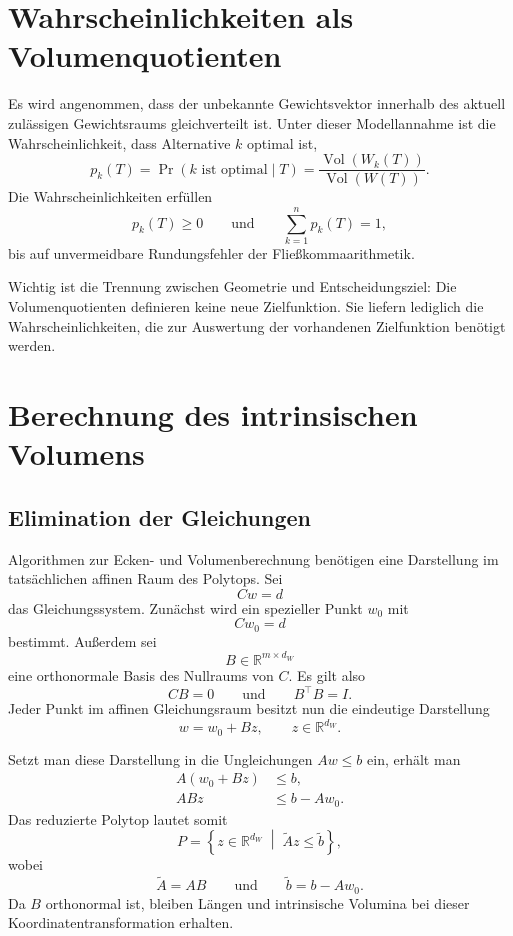\documentclass[11pt,a4paper]{article}
\newcommand{\R}{\mathbb{R}}
\newcommand{\Vol}{\operatorname{Vol}}
\begin{document}
\section{Wahrscheinlichkeiten als Volumenquotienten}

Es wird angenommen, dass der unbekannte Gewichtsvektor innerhalb des aktuell
zulässigen Gewichtsraums gleichverteilt ist. Unter dieser Modellannahme ist
die Wahrscheinlichkeit, dass Alternative $k$ optimal ist,
\[
  p_k(T)
  =
  \Pr(k\text{ ist optimal}\mid T)
  =
  \frac{\Vol(W_k(T))}{\Vol(W(T))}.
\]
Die Wahrscheinlichkeiten erfüllen
\[
  p_k(T)\geq 0
  \qquad\text{und}\qquad
  \sum_{k=1}^{n}p_k(T)=1,
\]
bis auf unvermeidbare Rundungsfehler der Fließkommaarithmetik.

Wichtig ist die Trennung zwischen Geometrie und Entscheidungsziel:
Die Volumenquotienten definieren keine neue Zielfunktion. Sie liefern lediglich
die Wahrscheinlichkeiten, die zur Auswertung der vorhandenen Zielfunktion
benötigt werden.

\section{Berechnung des intrinsischen Volumens}

\subsection{Elimination der Gleichungen}

Algorithmen zur Ecken- und Volumenberechnung benötigen eine Darstellung im
tatsächlichen affinen Raum des Polytops. Sei
\[
  Cw=d
\]
das Gleichungssystem. Zunächst wird ein spezieller Punkt $w_0$ mit
\[
  Cw_0=d
\]
bestimmt. Außerdem sei
\[
  B\in\R^{m\times d_W}
\]
eine orthonormale Basis des Nullraums von $C$. Es gilt also
\[
  CB=0
  \qquad\text{und}\qquad
  B^\top B=I.
\]
Jeder Punkt im affinen Gleichungsraum besitzt nun die eindeutige Darstellung
\[
  w=w_0+Bz,
  \qquad z\in\R^{d_W}.
\]

Setzt man diese Darstellung in die Ungleichungen $Aw\leq b$ ein, erhält man
\begin{align*}
  A(w_0+Bz)&\leq b,\\
  ABz&\leq b-Aw_0.
\end{align*}
Das reduzierte Polytop lautet somit
\[
  P
  =
  \left\{
    z\in\R^{d_W}
    \;\middle|\;
    \widetilde A z\leq\widetilde b
  \right\},
\]
wobei
\[
  \widetilde A=AB
  \qquad\text{und}\qquad
  \widetilde b=b-Aw_0.
\]
Da $B$ orthonormal ist, bleiben Längen und intrinsische Volumina bei dieser
Koordinatentransformation erhalten.
\end{document}
